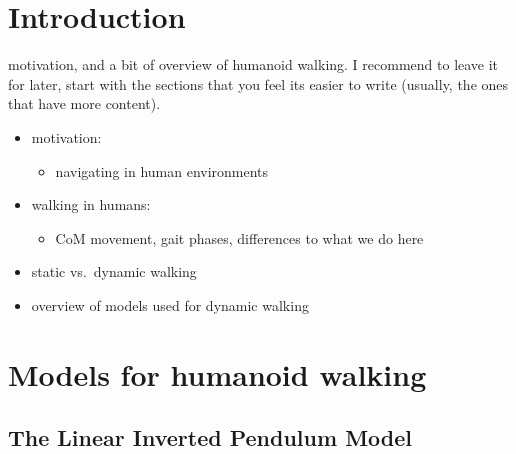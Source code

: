 \documentclass[english,ngerman]{KITreprt}
\newcommand{\clr}[2]{{\color{#1}{#2}}}
\newcommand{\todo}[1]{\marginpar{\clr{red}{#1}}}
\begin{document}



\maketitle

\tableofcontents

\chapter{Introduction}\label{introduction}

motivation, and a bit of overview of humanoid walking. I recommend to
leave it for later, start with the sections that you feel its easier to
write (usually, the ones that have more content).

\begin{itemize}
\itemsep1pt\parskip0pt
\item
  motivation:

  \begin{itemize}
  \itemsep1pt\parskip0pt
  \item
    navigating in human environments
  \end{itemize}
\item
  walking in humans:

  \begin{itemize}
  \itemsep1pt\parskip0pt
  \item
    CoM movement, gait phases, differences to what we do here
  \end{itemize}
\item
  static vs.~dynamic walking
\item
  overview of models used for dynamic walking
\end{itemize}

\chapter{Models for humanoid walking}\label{models-for-humanoid-walking}

\section{The Linear Inverted Pendulum
Model}\label{the-linear-inverted-pendulum-model}

\todo{Use different name for CoM, $p$ will be rather used for the ZMP, maybe $c$?}
\end{document}

